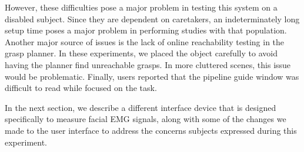 However, these difficulties pose a major problem in testing this system on a disabled subject. Since they are dependent on caretakers, an indeterminately long setup time poses a major problem in performing studies with that population. Another major source of issues is the lack of online reachability testing in the grasp planner. In these experiments, we placed the object carefully to avoid having the planner find unreachable grasps. In more cluttered scenes, this issue would be problematic. Finally, users reported that the pipeline guide window was difficult to read while focused on the task.

In the next section, we describe a different interface device that is designed specifically to measure facial EMG signals, along with some of the changes we made to the user interface to address the concerns subjects expressed during this experiment.
